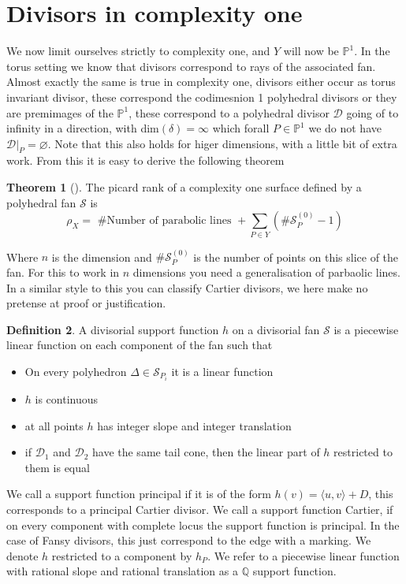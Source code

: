 \documentclass[11pt]{amsart}
\theoremstyle{definition}
\newtheorem{thm}{Theorem}[section]
\theoremstyle{definition}
\theoremstyle{definition}
\theoremstyle{definition}
\newtheorem{dfn}[thm]{Definition}
\theoremstyle{definition}
\theoremstyle{definition}
\theoremstyle{definition}
\begin{document}
\section{Divisors in complexity one}

We now limit ourselves strictly to complexity one, and $Y$ will now be $\mathbb{P}^1$. In the torus setting we know that divisors correspond to rays of the associated fan. Almost exactly the same is true in complexity one, divisors either occur as torus invariant divisor, these correspond the codimesnion 1 polyhedral divisors or they are premimages of the $\mathbb{P}^1$, these correspond to a polyhedral divisor $\mathcal{D}$  going of to infinity in a direction, with dim$(\delta) = \infty$ which forall $P \in \mathbb{P}^1$ we do not have $\mathcal{D}  |_P = \varnothing$. Note that this also holds for higer dimensions, with a little bit of extra work. From this it is easy to derive the following theorem
\\
\begin{thm}[\cite{PS}]
The picard rank of a complexity one surface defined by a polyhedral fan $\mathcal{S}$ is 
\[
\rho_X =  \text{ \# Number of parabolic lines } + \sum_{P \in Y} (\# \mathcal{S}_P^{(0)} - 1) 
\]
\end{thm}
Where $n$ is the dimension and $\# \mathcal{S}_P^{(0)}$ is the number of points on this slice of the fan.
For this to work in $n$ dimensions you need a generalisation of parbaolic lines. In a similar style to this you can classify Cartier divisors, we here make no pretense at proof or justification. 
\begin{dfn}
A divisorial support function $h$ on a divisorial fan $\mathcal{S}$ is a piecewise linear function on each component of the fan such that

\begin{itemize}
\item On every polyhedron $\Delta \in \mathcal{S}_{P_i}$ it is a linear function
\item $h$ is continuous
\item at all points $h$ has integer slope and integer translation
\item if $\mathcal{D}_1$ and $\mathcal{D}_2$ have the same tail cone, then the linear part of $h$ restricted to them is equal
\end{itemize}
\end{dfn}
We call a support function principal if it is of the form $h(v) = \langle u, v \rangle + D$, this corresponds to a principal Cartier divisor. We call a support function Cartier, if on every component with complete locus the support function is principal. In the case of Fansy divisors, this just correspond to the edge with a marking. We denote $h$ restricted to a component by $h_P$.  We refer to a piecewise linear function with rational slope and rational translation as a $\mathbb{Q}$ support function.
\end{document}
